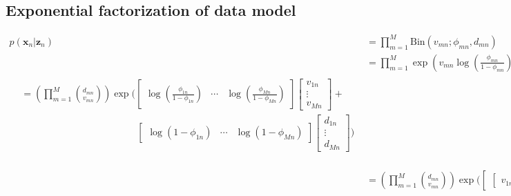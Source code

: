 \documentclass[11pt]{article}
\newcommand{\bx}{\ensuremath{\mathbf{x}}}
\newcommand{\bz}{\ensuremath{\mathbf{z}}}
\begin{document}
\begin{appendices}
\subsection{Exponential factorization of data model}
\vspace{-0.5cm}
\begin{align}
p(\bx_n | \bz_n) &= \prod\limits_{m=1}^M \mathrm{Bin}(v_{mn}; \phi_{mn}, d_{mn}) \nonumber \\
				 &= \prod\limits_{m=1}^M \exp\left(v_{mn} \log\left(\frac{\phi_{mn}}{1 - \phi_{mn}}\right) + (d_{mn} - v_{mn}) \log(1 - \phi_{mn}) \right) \nonumber \\				 		
\begin{split}
				&=\left( \prod\limits_{m=1}^M \binom{d_{mn}}{v_{mn}} \right)
				\exp\bigg( 
\begin{bmatrix}
         \log\left(\frac{\phi_{1n}}{1 - \phi_{1n}}\right) & \cdots & \log\left(\frac{\phi_{Mn}}{1 - \phi_{Mn}}\right)
        \end{bmatrix}\begin{bmatrix}
         v_{1n} \\ \vdots \\ v_{Mn}
        \end{bmatrix}  + \\
& \qquad \qquad\qquad\qquad\qquad\qquad \begin{bmatrix}
         \log\left(1 - \phi_{1n}\right) & \cdots & \log\left(1 - \phi_{Mn}\right)
        \end{bmatrix}      
                \begin{bmatrix}
         d_{1n} \\ \vdots \\ d_{Mn}
        \end{bmatrix} 
        \bigg)
        \end{split} \\
&=    \left( \prod\limits_{m=1}^M \binom{d_{mn}}{v_{mn}} \right)
			 \exp\bigg(
			\begin{bmatrix}
				\begin{bmatrix}
				 v_{1n} &  d_{1n}
				\end{bmatrix} & \cdots &
				\begin{bmatrix}
				 v_{Mn} &  d_{Mn}
				\end{bmatrix}
			\end{bmatrix}
			\begin{bmatrix}
				\begin{bmatrix}
					\log\left(1 - \phi_{1n}\right) \\ \log\left(\frac{\phi_{1n}}{1 - \phi_{1n}}\right)

\end{bmatrix}
\end{bmatrix}
\end{align}
\end{appendices}
\end{document}
